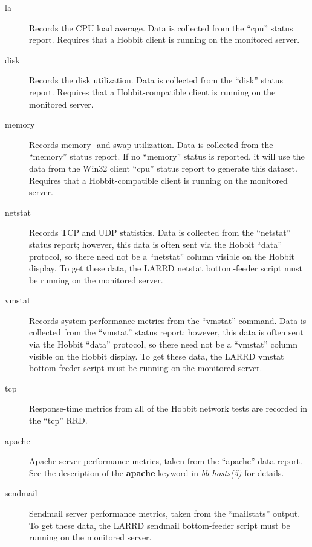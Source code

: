  \begin{description}
\item[la] Records the CPU load average. Data is collected from the ``cpu'' status report. Requires that a Hobbit client is running on the monitored server. 

 

\item[disk] Records the disk utilization. Data is collected from the ``disk'' status report. Requires that a Hobbit-compatible client is running on the monitored server. 

 

\item[memory] Records memory- and swap-utilization. Data is collected from the ``memory'' status report. If no ``memory'' status is reported, it will use the data from the Win32 client ``cpu'' status report to generate this dataset. Requires that a Hobbit-compatible client is running on the monitored server. 

 

\item[netstat] Records TCP and UDP statistics. Data is collected from the ``netstat'' status report; however, this data is often sent via the Hobbit ``data'' protocol, so there need not be a ``netstat'' column visible on the Hobbit display. To get these data, the LARRD netstat bottom-feeder script must be running on the monitored server. 

 

\item[vmstat] Records system performance metrics from the ``vmstat'' command. Data is collected from the ``vmstat'' status report; however, this data is often sent via the Hobbit ``data'' protocol, so there need not be a ``vmstat'' column visible on the Hobbit display. To get these data, the LARRD vmstat bottom-feeder script must be running on the monitored server. 

 

\item[tcp] Response-time metrics from all of the Hobbit network tests are recorded in the ``tcp'' RRD. 

 

\item[apache] Apache server performance metrics, taken from the ``apache'' data report. See the description of the \textbf{apache}
 keyword in \emph{bb-hosts(5)}
 for details. 

 

\item[sendmail] Sendmail server performance metrics, taken from the ``mailstats'' output. To get these data, the LARRD sendmail bottom-feeder script must be running on the monitored server. 


\end{description}
